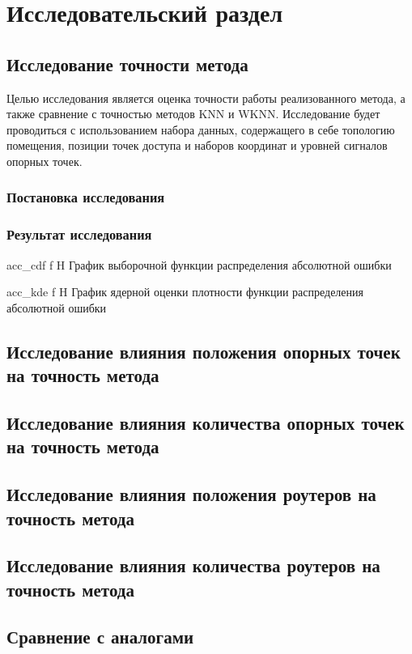 \chapter{Исследовательский раздел}

\section{Исследование точности метода}

Целью исследования является оценка точности работы реализованного метода, а также сравнение с точностью методов KNN и WKNN. Исследование будет проводиться с использованием набора данных, содержащего в себе топологию помещения, позиции точек доступа и наборов координат и уровней сигналов опорных точек. 

\subsection{Постановка исследования}



\subsection{Результат исследования}

    {acc_cdf}
    {f}
    {H}
    {\linewidth}
    {График выборочной функции распределения абсолютной ошибки}

    {acc_kde}
    {f}
    {H}
    {\linewidth}
    {График ядерной оценки плотности функции распределения абсолютной ошибки}

\section{Исследование влияния положения опорных точек на точность метода}

\section{Исследование влияния количества опорных точек на точность метода}

\section{Исследование влияния положения роутеров на точность метода}

\section{Исследование влияния количества роутеров на точность метода}

\section{Сравнение с аналогами}
